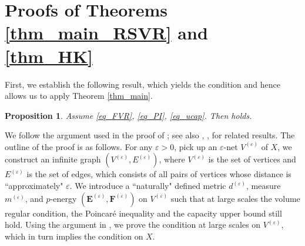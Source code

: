 \documentclass[11pt,a4paper]{article}
\numberwithin{equation}{section}
\theoremstyle{plain}
\newtheorem{proposition}[theorem]{Proposition}
\theoremstyle{definition}
\begin{document}
\section{Proofs of Theorems \ref{thm_main_RSVR} and \ref{thm_HK}}\label{sec_RSVR}

First, we establish the following result, which yields the \hyperlink{eq_LLC}{} condition and hence allows us to apply Theorem \ref{thm_main}.

\begin{proposition}\label{prop_LLC}
Assume \ref{eq_FVR}, \ref{eq_PI}, \ref{eq_ucap}. Then \hyperlink{eq_LLC}{} holds.
\end{proposition}

We follow the argument used in the proof of \cite[Theorem 3.3]{Kor07}; see also \cite[THEOREM 3.13]{HK98}, \cite[Theorem 9.4.1]{HKST15}, \cite[Proposition 3.4]{Mur19} for related results. The outline of the proof is as follows. For any $\varepsilon>0$, pick up an $\varepsilon$-net $V^{(\varepsilon)}$ of $X$, we construct an infinite graph $(V^{(\varepsilon)},E^{(\varepsilon)})$, where $V^{(\varepsilon)}$ is the set of vertices and $E^{(\varepsilon)}$ is the set of edges, which consists of all pairs of vertices whose distance is ``approximately" $\varepsilon$. We introduce a ``naturally" defined metric $d^{(\varepsilon)}$, measure $m^{(\varepsilon)}$, and $p$-energy $(\mathbf{E}^{(\varepsilon)},\mathbf{F}^{(\varepsilon)})$ on $V^{(\varepsilon)}$ such that at large scales the volume regular condition, the Poincar\'e inequality and the capacity upper bound still hold. Using the argument in \cite{Kor07}, we prove the \hyperlink{eq_LLC}{} condition at large scales on $V^{(\varepsilon)}$, which in turn implies the \hyperlink{eq_LLC}{} condition on $X$.
\end{document}
